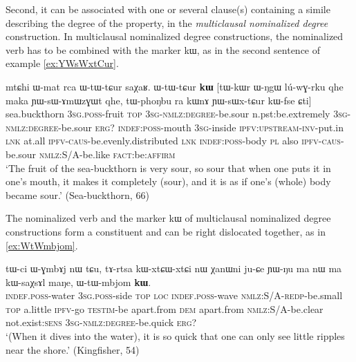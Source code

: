 \documentclass[oldfontcommands,oneside,a4paper,11pt]{article}
\newcommand{\ipa}[1]{{\phon #1}} %
\begin{document}
Second, it can be associated  with one or several  clause(s) containing a simile describing the degree of the property, in the \textit{multiclausal nominalized degree} construction. In multiclausal nominalized degree constructions, the nominalized verb has to be combined with the marker \ipa{kɯ}, as in the second sentence of example \ref{ex:YWsWxtCur}.




\begin{exe}
\ex \label{ex:YWsWxtCur}
\gll 
\ipa{mtɕhi}  	\ipa{ɯ-mat}  	\ipa{rca}  	\ipa{ɯ-tɯ-tɕur}  	\ipa{saχaʁ.}  	\ipa{ɯ-tɯ-tɕur}  	\ipa{\textbf{kɯ}}  	[\ipa{tɯ-kɯr}  	\ipa{ɯ-ŋgɯ}  	\ipa{lú-wɣ-rku}  	\ipa{qhe}  	\ipa{maka}  	\ipa{ɲɯ-sɯ-ɤmɯzɣɯt}  	\ipa{qhe,}  	\ipa{tɯ-phoŋbu}  	\ipa{ra}  	\ipa{kɯnɤ}  	\ipa{ɲɯ-sɯx-tɕur}  	\ipa{kɯ-fse}  	\ipa{ɕti}]  \\
sea.buckthorn \textsc{3sg.poss}-fruit \textsc{top} \textsc{3sg-nmlz:degree}-be.sour n.pst:be.extremely \textsc{3sg-nmlz:degree}-be.sour \textsc{erg?} \textsc{indef:poss}-mouth \textsc{3sg}-inside \textsc{ipfv:upstream-inv}-put.in \textsc{lnk} at.all \textsc{ipfv-caus}-be.evenly.distributed \textsc{lnk} \textsc{indef:poss}-body \textsc{pl} also \textsc{ipfv-caus}-be.sour \textsc{nmlz:S/A}-be.like \textsc{fact}:be:\textsc{affirm} \\
\glt `The fruit of the sea-buckthorn is very sour, so sour that when one puts it in one's mouth, it makes it completely (sour), and it is as if one's (whole) body became sour.' (Sea-buckthorn, 66)
\end{exe}

The nominalized verb and the marker \ipa{kɯ} of multiclausal  nominalized degree constructions form a constituent and can be right dislocated together, as in \ref{ex:WtWmbjom}.

 \begin{exe}
\ex \label{ex:WtWmbjom}
\gll 
\ipa{tɯ-ci}  	\ipa{ɯ-ɣmbɤj}  	\ipa{nɯ}  	\ipa{tɕu,}  	  	\ipa{tɤ-rtsa}  	\ipa{kɯ-xtɕɯ-xtɕi}  	\ipa{nɯ}  	\ipa{χanɯni}  	\ipa{ju-ɕe}  	\ipa{ɲɯ-ŋu}  	\ipa{ma}  	\ipa{nɯ}  	\ipa{ma}  	\ipa{kɯ-saχsɤl}  	\ipa{maŋe,}  	\ipa{ɯ-tɯ-mbjom}  	\ipa{\textbf{kɯ}.}  \\
\textsc{indef.poss}-water \textsc{3sg.poss}-side \textsc{top} \textsc{loc} \textsc{indef.poss}-wave \textsc{nmlz:S/A-redp}-be.small \textsc{top} a.little \textsc{ipfv}-go \textsc{testim}-be apart.from \textsc{dem} apart.from   \textsc{nmlz:S/A}-be.clear not.exist:\textsc{sens} \textsc{3sg-nmlz:degree}-be.quick \textsc{erg?} \\
\glt `(When it dives into the water), it is so quick that one can only see little ripples near the shore.'
 (Kingfisher, 54)
\end{exe}
\end{document}
